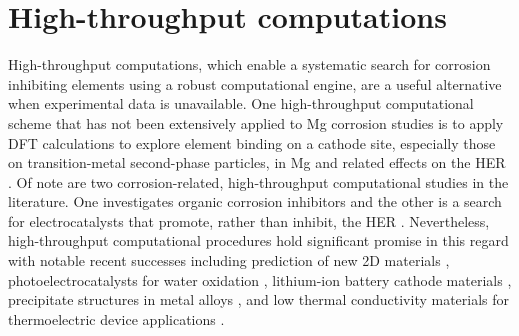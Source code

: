 \section{High-throughput computations}
High-throughput computations, which enable a systematic search for corrosion inhibiting elements using a robust computational engine, are a useful alternative when experimental data is unavailable. One high-throughput computational scheme that has not been extensively applied to Mg corrosion studies is to apply \ac{DFT} calculations to explore element binding on a cathode site, especially those on transition-metal second-phase particles, in Mg and related effects on the \ac{HER} \cite{zhang2019first}. Of note are two corrosion-related, high-throughput computational studies in the literature. One investigates organic corrosion inhibitors \cite{winkler2017predicting} and the other is a search for electrocatalysts that promote, rather than inhibit, the \ac{HER} \cite{greeley2006computational}. Nevertheless, high-throughput computational procedures hold significant promise in this regard with notable recent successes including prediction of new 2D materials \cite{choudhary2017high}, photoelectrocatalysts for water oxidation \cite{yan2017solar}, lithium-ion battery cathode materials \cite{tanaka2016toward,lu2017data}, precipitate structures in metal alloys \cite{saal2013materials}, and low thermal conductivity materials for thermoelectric device applications \cite{tanaka2016toward,seko2015prediction}.
